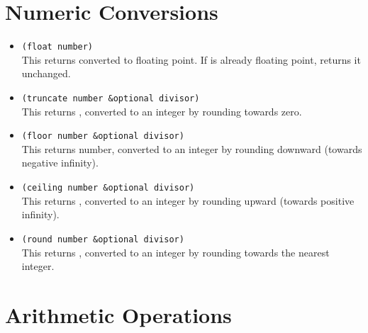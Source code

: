 \section{Numeric Conversions}
\label{sec:numeric-conversions}

\begin{itemize}[itemsep=10pt]
\item \lstinline|(float number)|\\
  This returns  converted to floating point.
  If  is already floating point,  returns it unchanged.
  
\item \lstinline|(truncate number &optional divisor)|\\
  This returns , converted to an integer by rounding towards zero.
\item \lstinline|(floor number &optional divisor)|\\
  This returns number, converted to an integer by rounding downward (towards negative infinity).
\item \lstinline|(ceiling number &optional divisor)|\\
  This returns , converted to an integer by rounding upward (towards positive infinity).
\item \lstinline|(round number &optional divisor)|\\
  This returns , converted to an integer by rounding towards the nearest integer.
\end{itemize}

\section{Arithmetic Operations} 
\label{sec:arithm-opera}

